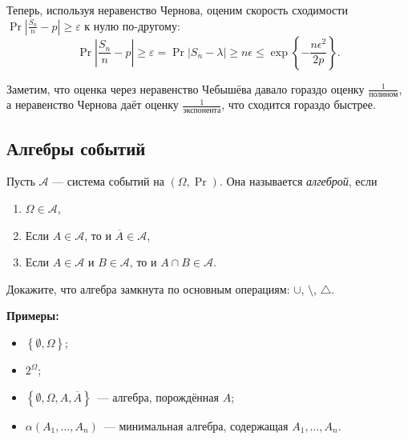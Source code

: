 Теперь, используя неравенство Чернова, оценим скорость сходимости \(\Pr{|\frac{S_n}{n} - p| \geq \varepsilon}\) к нулю по-другому:
\[\Pr{\left|\frac{S_n}{n} - p\right| \geq \varepsilon} = \Pr{\left|S_n - \lambda\right| \geq n\epsilon} \leq \exp\left\{-\frac{n\epsilon^2}{2p}\right\}.\]

Заметим, что оценка через неравенство Чебышёва давало гораздо оценку \(\frac{1}{\text{полином}}\), а неравенство Чернова даёт оценку \(\frac{1}{\text{экспонента}}\), что сходится гораздо быстрее.

\subsection{Алгебры событий}
\begin{definition}
    Пусть $\mathcal{A}$ --- система событий на $(\Omega, \Pr)$. Она называется \emph{алгеброй}, если
    \begin{enumerate}
        \item \(\Omega \in \mathcal{A}\),
        \item Если \(A \in \mathcal{A}\), то и \(\overline{A} \in \mathcal{A}\),
        \item Если \(A \in \mathcal{A}\) и \(B \in \mathcal{A}\), то и \(A \cap B \in \mathcal{A}\).
    \end{enumerate}
\end{definition}

\begin{exercise}
    Докажите, что алгебра замкнута по основным операциям: \(\cup\), \(\setminus\), \(\triangle\).
\end{exercise}

\noindent\textbf{Примеры:}

\begin{itemize}
    \item \(\left\{ \emptyset, \Omega \right\}\);
    \item \(2^{\Omega}\);
    \item \(\left\{ \emptyset, \Omega, A, \overline{A}\right\}\)~--- алгебра, порождённая \(A\);
    \item \(\alpha\left( A_1, \ldots, A_n \right)\)~--- минимальная алгебра, содержащая \(A_1, \dots, A_n\).
\end{itemize}